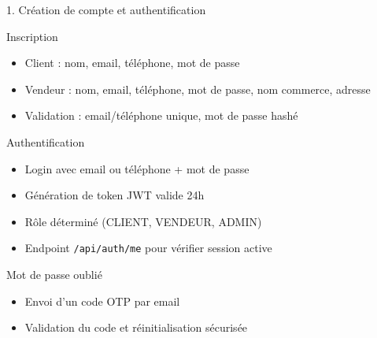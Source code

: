 \documentclass[aspectratio=169,9pt,demo]{beamer}
\begin{document}
\begin{frame}{1. Création de compte et authentification}
\begin{block}{Inscription}
\begin{itemize}
    \item Client : nom, email, téléphone, mot de passe
    \item Vendeur : nom, email, téléphone, mot de passe, nom commerce, adresse
    \item Validation : email/téléphone unique, mot de passe hashé
\end{itemize}
\end{block}

\begin{block}{Authentification}
\begin{itemize}
    \item Login avec email ou téléphone + mot de passe
    \item Génération de token JWT valide 24h
    \item Rôle déterminé (CLIENT, VENDEUR, ADMIN)
    \item Endpoint \texttt{/api/auth/me} pour vérifier session active
\end{itemize}
\end{block}

\begin{block}{Mot de passe oublié}
\begin{itemize}
    \item Envoi d'un code OTP par email
    \item Validation du code et réinitialisation sécurisée
\end{itemize}
\end{block}
\end{frame}
\end{document}
